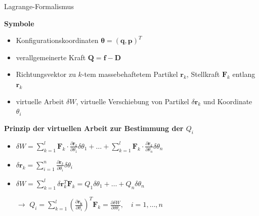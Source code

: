 \documentclass[
	ngerman,
	10pt,				%
	aspectratio=169 	%
]{beamer}
\begin{document}
\begin{frame}[t,fragile,label=Lagrange2_2]{\large Lagrange-Formalismus}
	
	\textbf{Symbole}
	\begin{itemize}
		\item Konfigurationskoordinaten $\boldsymbol{\theta} = (\mathbf{q}, \mathbf{p})^T$
		\item verallgemeinerte Kraft $\mathbf{Q} = \mathbf{f} - \mathbf{D}$
		\pause
		\item Richtungsvektor zu $k$-tem massebehaftetem Partikel $\mathbf{r}_k$, Stellkraft $\mathbf{F}_k$ entlang $\mathbf{r}_k$
		\pause
		\item virtuelle Arbeit $\delta W$, virtuelle Verschiebung von Partikel $\delta \mathbf{r}_k$ und Koordinate $\theta_{i}$
	\end{itemize}
	
	\pause
	\bigskip
	\textbf{Prinzip der virtuellen Arbeit zur Bestimmung der $Q_i$}
	\begin{itemize}
		\pause
		\item  $\delta W = \sum_{k=1}^l \mathbf{F}_k \cdot \frac{\partial \mathbf{r}_k}{\partial \theta_1} \delta \theta_1 +\ldots + \sum_{k=1}^l \mathbf{F}_k \cdot \frac{\partial \mathbf{r}_k}{\partial \theta_n} \delta \theta_n$
		\pause
		\item $\delta \mathbf{r}_{k} = \sum_{i = 1}^{n} \frac{\partial\mathbf{r}_{k}}{\partial\theta_i} \delta \theta_i$
		\pause
		\item $\delta W = \sum_{k=1}^{l}\delta \mathbf{r}_k^T \mathbf{F}_k = Q_1 \delta \theta_1 + \ldots + Q_n\delta \theta_n$
		\pause
		\item[$\rightarrow$] $Q_i = \sum_{k=1}^l \left(\frac {\partial \mathbf{r_k}} {\partial \theta_i} \right)^T \mathbf {F}_{k} = \frac{\partial\delta W}{\partial \delta \theta_i} ,\quad i=1,\ldots, n$
	\end{itemize}
	
\end{frame}

\end{document}
